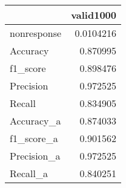 
\begin{tabular}{lr}
\hline
             &     valid1000 \\
\hline
 nonresponse & 0.0104216 \\
 Accuracy    & 0.870995  \\
 f1_score    & 0.898476  \\
 Precision   & 0.972525  \\
 Recall      & 0.834905  \\
 Accuracy_a  & 0.874033  \\
 f1_score_a  & 0.901562  \\
 Precision_a & 0.972525  \\
 Recall_a    & 0.840251  \\
\hline
\end{tabular}